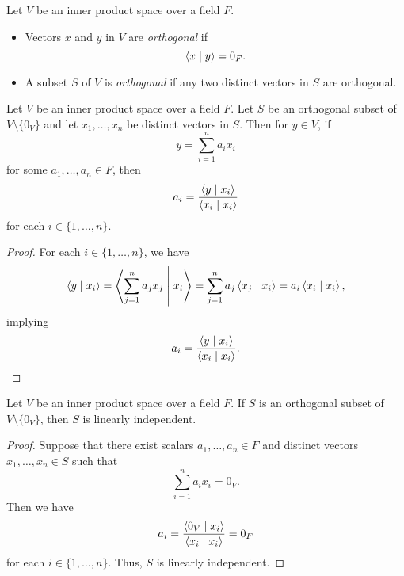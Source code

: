 \begin{definition}
  Let $V$ be an inner product space over a field $F$.
  \begin{itemize}
    \item Vectors $x$ and $y$ in $V$ are \emph{orthogonal} if
    \begin{equation*}
      \left\langle x \; \middle| \; y \right\rangle = 0_F.
    \end{equation*}
    \item A subset $S$ of $V$ is \emph{orthogonal} if any two distinct vectors
    in $S$ are orthogonal.
  \end{itemize}
\end{definition}

\begin{theorem}
  \label{thm:orthogonal-decomposition}
  Let $V$ be an inner product space over a field $F$.
  Let $S$ be an orthogonal subset of $V \setminus \{0_V\}$ and let
  $x_1, \dots, x_n$ be distinct vectors in $S$.
  Then for $y \in V$, if
  \begin{equation*}
    y = \sum_{i=1}^n a_ix_i
  \end{equation*}
  for some $a_1, \dots, a_n \in F$, then
  \begin{equation*}
    a_i = \frac{\left\langle y \; \middle| \; x_i \right\rangle}{\left\langle x_i \; \middle| \; x_i \right\rangle}
  \end{equation*}
  for each $i \in \{1, \dots, n\}$.
\end{theorem}
\begin{proof}
  For each $i \in \{1, \dots, n\}$, we have
  \begin{equation*}
    \left\langle y \; \middle| \; x_i \right\rangle
    = \left\langle \sum_{j=1}^n a_jx_j \; \middle| \; x_i \right\rangle
    = \sum_{j=1}^n a_j \left\langle x_j \; \middle| \; x_i \right\rangle
    = a_i \left\langle x_i \; \middle| \; x_i \right\rangle,
  \end{equation*}
  implying
  \begin{equation*}
    a_i = \frac{\left\langle y \; \middle| \; x_i \right\rangle}{\left\langle x_i \; \middle| \; x_i \right\rangle}.
    \qedhere
  \end{equation*}
\end{proof}

\begin{corollary}
  \label{thm:orthogonal-linearly-independent}
  Let $V$ be an inner product space over a field $F$.
  If $S$ is an orthogonal subset of $V \setminus \{0_V\}$, then $S$ is linearly
  independent.
\end{corollary}
\begin{proof}
  Suppose that there exist scalars $a_1, \dots, a_n \in F$ and distinct vectors
  $x_1, \dots, x_n \in S$ such that
  \begin{equation*}
    \sum_{i=1}^n a_ix_i = 0_V.
  \end{equation*}
  Then we have
  \begin{equation*}
    a_i = \frac{\left\langle 0_V \; \middle| \; x_i \right\rangle}{\left\langle x_i \; \middle| \; x_i \right\rangle} = 0_F
  \end{equation*}
  for each $i \in \{1, \dots, n\}$.
  Thus, $S$ is linearly independent.
\end{proof}

